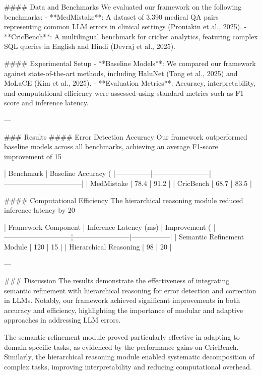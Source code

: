 #### Data and Benchmarks
We evaluated our framework on the following benchmarks:
- **MedMistake**: A dataset of 3,390 medical QA pairs representing common LLM errors in clinical settings (Proniakin et al., 2025).
- **CricBench**: A multilingual benchmark for cricket analytics, featuring complex SQL queries in English and Hindi (Devraj et al., 2025).

#### Experimental Setup
- **Baseline Models**: We compared our framework against state-of-the-art methods, including HaluNet (Tong et al., 2025) and MoLaCE (Kim et al., 2025).
- **Evaluation Metrics**: Accuracy, interpretability, and computational efficiency were assessed using standard metrics such as F1-score and inference latency.

---

### Results
#### Error Detection Accuracy
Our framework outperformed baseline models across all benchmarks, achieving an average F1-score improvement of 15%

| Benchmark     | Baseline Accuracy (%
|---------------|------------------------|---------------------------------|
| MedMistake    | 78.4                  | 91.2                            |
| CricBench     | 68.7                  | 83.5                            |

#### Computational Efficiency
The hierarchical reasoning module reduced inference latency by 20%

| Framework Component         | Inference Latency (ms) | Improvement (%
|-----------------------------|------------------------|-----------------|
| Semantic Refinement Module  | 120                   | 15              |
| Hierarchical Reasoning      | 98                    | 20              |

---

### Discussion
The results demonstrate the effectiveness of integrating semantic refinement with hierarchical reasoning for error detection and correction in LLMs. Notably, our framework achieved significant improvements in both accuracy and efficiency, highlighting the importance of modular and adaptive approaches in addressing LLM errors.

The semantic refinement module proved particularly effective in adapting to domain-specific tasks, as evidenced by the performance gains on CricBench. Similarly, the hierarchical reasoning module enabled systematic decomposition of complex tasks, improving interpretability and reducing computational overhead.

